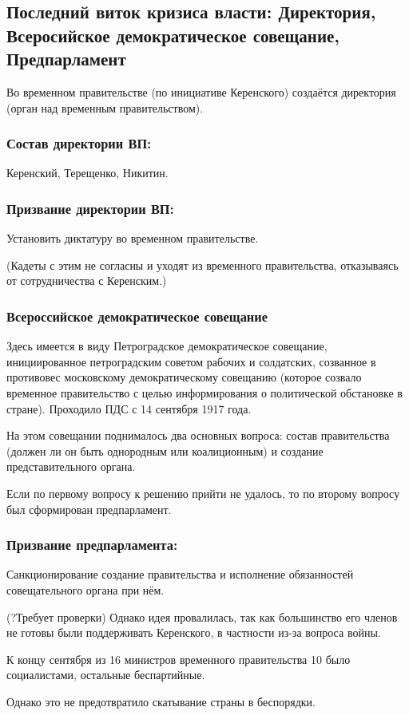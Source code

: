 \subsection{Последний виток кризиса власти: Директория, Всеросийское демократическое совещание, Предпарламент}

Во временном правительстве (по инициативе Керенского) создаётся директория (орган над временным правительством).

\subsubsection{\textbf{Состав директории ВП:}}

Керенский, Терещенко, Никитин.

\subsubsection{\textbf{Призвание директории ВП:}}

Установить диктатуру во временном правительстве.

(Кадеты с этим не согласны и уходят из временного правительства, отказываясь от сотрудничества с Керенским.)

\subsubsection{\textbf{Всероссийское демократическое совещание}}

Здесь имеется в виду Петроградское демократическое совещание, инициированное петроградским советом рабочих и солдатских, созванное в противовес московскому демократическому совещанию (которое созвало временное правительство с целью информирования о политической обстановке в стране). Проходило ПДС с 14 сентября 1917 года. 

На этом совещании поднималось два основных вопроса: состав правительства (должен ли он быть однородным или коалиционным) и создание представительного органа.

Если по первому вопросу к решению прийти не удалось, то по второму вопросу был сформирован предпарламент.

\subsubsection{\textbf{Призвание предпарламента:}}
 
Санкционирование создание правительства и исполнение обязанностей совещательного органа при нём.

(?Требует проверки) Однако идея провалилась, так как большинство его членов не готовы были поддерживать Керенского, в частности из-за вопроса войны.

К концу сентября из 16 министров временного правительства 10 было социалистами, остальные беспартийные.

Однако это не предотвратило скатывание страны в беспорядки.